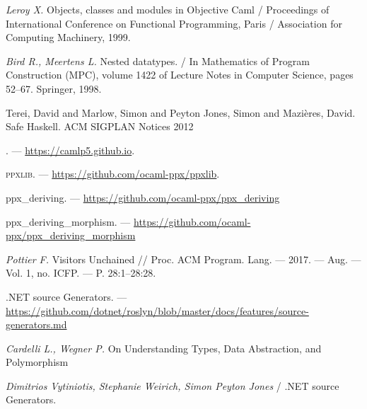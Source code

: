 \begin{thebibliography}{99}
{\em       Leroy X.} 
Objects, classes and modules in Objective Caml / Proceedings of International Conference on Functional Programming, Paris /     Association for Computing Machinery, 1999.

{\em   Bird R.,  Meertens L.} 
 Nested datatypes.  /  In Mathematics of Program Construction
(MPC), volume 1422 of Lecture Notes in Computer Science, pages 52–67. Springer, 1998.

Terei, David and Marlow, Simon and Peyton Jones, Simon and Mazières, David. Safe Haskell. ACM SIGPLAN Notices 2012

\camlpfive{}. --- \url{https://camlp5.github.io}.
 
\textsc{ppxlib}. --- \url{https://github.com/ocaml-ppx/ppxlib}.

ppx\_deriving. --- \url{https://github.com/ocaml-ppx/ppx\_deriving}

ppx\_deriving\_morphism. --- \url{https://github.com/ocaml-ppx/ppx\_deriving\_morphism}


{\em Pottier F.} Visitors Unchained // Proc. ACM Program.
Lang. — 2017. — Aug. — Vol. 1, no. ICFP. — P. 28:1–28:28. 

.NET source Generators. --- \url{https://github.com/dotnet/roslyn/blob/master/docs/features/source-generators.md}


{\em Cardelli L., Wegner P.} On Understanding Types,
Data Abstraction, and Polymorphism



{\em Dimitrios Vytiniotis, Stephanie Weirich, Simon Peyton Jones } /
.NET source Generators. 



\begin{comment}
\bibitem{AZ97}
{\em Абрамов С.А., Зима Е.В.} Семинар по компьютерной алгебре на
факультете вычислительной математики и кибернетики МГУ в 1995--1996 г.
// Программирование, 1997,
No 1. С. 75--77.

\bibitem{AZ98}
{\em Абрамов С.А., Зима Е.В.} Научно-ис\-сле\-до\-вательский семинар
``Компьютерная алгебра'' в 1996--1997 г.
// Программирование, 1998,
No 1. С. 69--72.


\end{comment}
\end{thebibliography}
